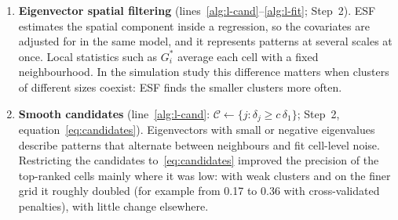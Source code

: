 \begin{enumerate}
The test does not depend on how the cells are labelled afterwards, so it can be used as a
first step for any local statistic. In the simulation study we also apply it to the
benchmarks ($G_i^*$ and local Moran's $I$), so that differences between methods in the
number of false hot cells come from the local statistic and not from the test.

\item\label{ch:esf} \textbf{Eigenvector spatial filtering} (lines~\ref{alg:l-cand}--\ref{alg:l-fit}; Step~2).
ESF estimates the spatial component inside a regression, so the covariates are adjusted for in the same model, and it represents patterns at several scales at once. Local statistics such as $G_i^*$ average each cell with a fixed neighbourhood. In the simulation study this difference matters when clusters of different sizes coexist: ESF finds the smaller clusters more often.

\item\label{ch:cand} \textbf{Smooth candidates} (line~\ref{alg:l-cand}: $\mathcal{C}\gets\{j:\delta_j\ge c\,\delta_1\}$; Step~2, equation~\eqref{eq:candidates}).
Eigenvectors with small or negative eigenvalues describe patterns that alternate between neighbours and fit cell-level noise. Restricting the candidates to~\eqref{eq:candidates} improved the precision of the top-ranked cells mainly where it was low: with weak clusters and on the finer grid it roughly doubled (for example from 0.17 to 0.36 with cross-validated penalties), with little change elsewhere.


\end{enumerate}
